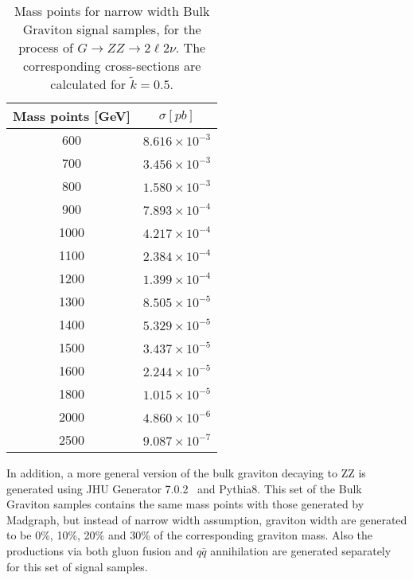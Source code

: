 \begin{table}[htbp]
  \begin{center}
    \caption{
      Mass points for narrow width Bulk Graviton signal samples, for the process of $G\rightarrow ZZ\rightarrow 2\ell 2\nu$. The corresponding cross-sections are calculated for $\tilde{k}=0.5$.
      \label{tab:sample_massps}}
    \begin{tabular}{c c}
      \hline\hline
      Mass points [GeV] & $\sigma [pb]$\\
      \hline
      600 &  $8.616\times 10^{-3}$ \\
      700 &  $3.456\times 10^{-3}$ \\
      800 &  $1.580\times 10^{-3}$ \\
      900 &  $7.893\times 10^{-4}$ \\
      1000 & $4.217\times 10^{-4}$ \\
      1100 & $2.384\times 10^{-4}$ \\
      1200 & $1.399\times 10^{-4}$ \\
      1300 & $8.505\times 10^{-5}$ \\
      1400 & $5.329\times 10^{-5}$ \\
      1500 & $3.437\times 10^{-5}$ \\
      1600 & $2.244\times 10^{-5}$ \\
      1800 & $1.015\times 10^{-5}$ \\
      2000 & $4.860\times 10^{-6}$ \\
      2500 & $9.087\times 10^{-7}$ \\
      \hline\hline
    \end{tabular}
  \end{center}
\end{table}


In addition, a more general version of the bulk graviton decaying to ZZ is generated using JHU Generator 7.0.2~\cite{sample_jhugen1,sample_jhugen2,sample_jhugen3} and Pythia8. This set of the Bulk Graviton samples contains the same mass points with those generated by Madgraph, but instead of narrow width assumption, graviton width are generated to be 0\%, 10\%, 20\% and 30\% of the corresponding graviton mass. Also the productions via both gluon fusion and $q\bar{q}$ annihilation are generated separately for this set of signal samples.
